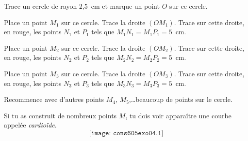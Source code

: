 \begin{myenumerate}
  \item Trace un cercle de rayon 2,5~cm et marque un point $O$ sur ce cercle.
  \item Place un point $M_1$ sur ce cercle. Trace la droite $(OM_1)$. Trace sur cette droite, en rouge, les points $N_1$ et $P_1$ tels que $M_1N_1=M_1P_1=5$~cm.
\item Place un point $M_2$ sur ce cercle. Trace la droite $(OM_2)$. Trace sur cette droite, en rouge, les points $N_2$ et $P_2$ tels que $M_2N_2=M_2P_2=5$~cm.
\item Place un point $M_3$ sur ce cercle. Trace la droite $(OM_3)$. Trace sur cette droite, en rouge, les points $N_3$ et $P_3$ tels que $M_3N_3=M_3P_3=5$~cm.
\item Recommence avec d'autres points $M_4$, $M_5$,\ldots beaucoup de points sur le cercle.
\end{myenumerate}
Si tu as construit de nombreux points $M$, tu dois voir apparaître
une courbe appelée {\em cardioïde}.
\[\texttt{[image: cons605exo04.1]}\]
